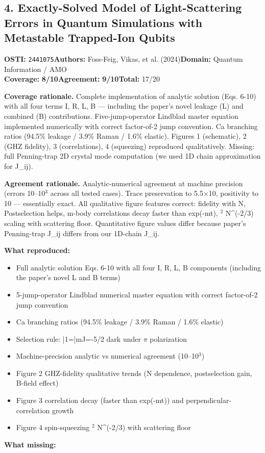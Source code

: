 \documentclass[11pt]{article}
\newcommand{\scorebadge}[2]{\textbf{#1:} \textbf{#2/10}}
\begin{document}
\subsection{4. Exactly-Solved Model of Light-Scattering Errors in Quantum Simulations with Metastable Trapped-Ion Qubits}
\textbf{OSTI:} \texttt{2441075}\quad\textbf{Authors:} Foss-Feig, Vikas, et al. (2024)\quad\textbf{Domain:} Quantum Information / AMO\\
\scorebadge{Coverage}{8}\quad\scorebadge{Agreement}{9}\quad\textbf{Total:} 17/20\par\smallskip
\noindent\textbf{Coverage rationale.} Complete implementation of analytic solution (Eqs. 6-10) with all four terms I, R, L, B --- including the paper's novel leakage (L) and combined (B) contributions. Five-jump-operator Lindblad master equation implemented numerically with correct factor-of-2 jump convention. Ca branching ratios (94.5\% leakage / 3.9\% Raman / 1.6\% elastic). Figures 1 (schematic), 2 (GHZ fidelity), 3 (correlations), 4 (squeezing) reproduced qualitatively. Missing: full Penning-trap 2D crystal mode computation (we used 1D chain approximation for J\_ij).\par
\noindent\textbf{Agreement rationale.} Analytic-numerical agreement at machine precision (errors 10--10$^3$ across all tested cases). Trace preservation to 5.5$\times$10, positivity to 10 --- essentially exact. All qualitative figure features correct: fidelity  with N, Postselection helps, m-body correlations decay faster than exp(-mt), $^2$  N\textasciicircum{}(-2/3) scaling with scattering floor. Quantitative figure values differ because paper's Penning-trap J\_ij differs from our 1D-chain J\_ij.\par\smallskip
\noindent\textbf{What reproduced:}
\begin{itemize}[leftmargin=1.4em,itemsep=0.2em,topsep=0.2em]
\item Full analytic solution Eqs. 6-10 with all four I, R, L, B components (including the paper's novel L and B terms)
\item 5-jump-operator Lindblad numerical master equation with correct factor-of-2 jump convention
\item Ca branching ratios (94.5\% leakage / 3.9\% Raman / 1.6\% elastic)
\item Selection rule: |1=|mJ=-5/2 dark under $\pi$ polarization
\item Machine-precision analytic vs numerical agreement (10--10$^3$)
\item Figure 2 GHZ-fidelity qualitative trends (N dependence, postselection gain, B-field effect)
\item Figure 3 correlation decay (faster than exp(-mt)) and perpendicular-correlation growth
\item Figure 4 spin-squeezing $^2$  N\textasciicircum{}(-2/3) with scattering floor
\end{itemize}\noindent\textbf{What missing:}
\end{document}

